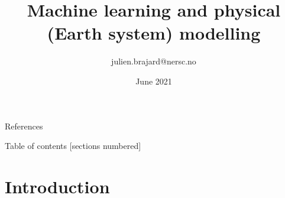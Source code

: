 \documentclass[handout, 10pt]{beamer}
\title[Machine Learning]{Machine learning and physical (Earth system) modelling}
\author[J. Brajard]{julien.brajard@nersc.no}
\institute[NERSC]{NERSC\\
slides+notebook:\url{https://github.com/nansencenter/ml-crashcourse}}
\date{June 2021}
\begin{document}
\begin{frame}
\titlepage
\end{frame}



\begin{frame}{References}
    
    \nocite{Goodfellow-et-al-2016,VanderPlas-2016}

\end{frame}

\begin{frame}[allowframebreaks]{Table of contents}
  [sections numbered]
  \tableofcontents[hideallsubsections]
\end{frame}




\section{Introduction}
\end{document}

